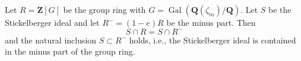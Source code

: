 Let $R = \mathbf{Z}[G]$ be the group ring with $G = \operatorname{Gal}(\mathbf{Q}(\zeta_m)/\mathbf{Q})$. Let $S$ be the Stickelberger ideal and let $R^- = (1-e)R$ be the minus part. Then
$$S \cap R = S \cap R^-$$
and the natural inclusion $S \subset R^-$ holds, i.e., the Stickelberger ideal is contained in the minus part of the group ring.
